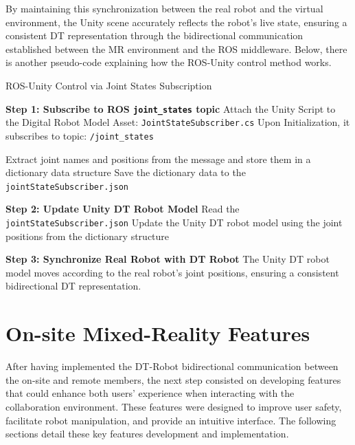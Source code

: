 By maintaining this synchronization between the real robot and the virtual environment, the Unity scene accurately reflects the robot's live state, ensuring a consistent \ac{DT} representation through the bidirectional communication established between the \ac{MR} environment and the \ac{ROS} middleware. Below, there is another pseudo-code explaining how the \ac{ROS}-Unity control method works.


\begin{algorithm}
    \caption{ROS-Unity Control via Joint States Subscription}\label{alg:ros_unity_control}
    \begin{algorithmic}[1]
        \State \textbf{Step 1: Subscribe to ROS \texttt{joint\_states} topic}
        \State Attach the Unity Script to the Digital Robot Model Asset: \texttt{JointStateSubscriber.cs}
        \State Upon Initialization, it subscribes to topic: \texttt{/joint\_states}

            \State Extract joint names and positions from the message and store them in a dictionary data structure
            \State Save the dictionary data to the \texttt{jointStateSubscriber.json}
        \EndWhile

        \State \textbf{Step 2: Update Unity \ac{DT} Robot Model}
            \State Read the \texttt{jointStateSubscriber.json}
            \State Update the Unity \ac{DT} robot model using the joint positions from the dictionary structure
        \EndWhile

        \State \textbf{Step 3: Synchronize Real Robot with \ac{DT} Robot}
        \State The Unity \ac{DT} robot model moves according to the real robot’s joint positions, ensuring a consistent bidirectional \ac{DT} representation.
    \end{algorithmic}
\end{algorithm}



\section{On-site Mixed-Reality Features}
\label{section:on-site-features}
After having implemented the \ac{DT}-Robot bidirectional communication between the on-site and remote members, the next step consisted on developing features that could enhance both users' experience when interacting with the collaboration environment. These features were designed to improve user safety, facilitate robot manipulation, and provide an intuitive interface. The following sections detail these key features development and implementation.

